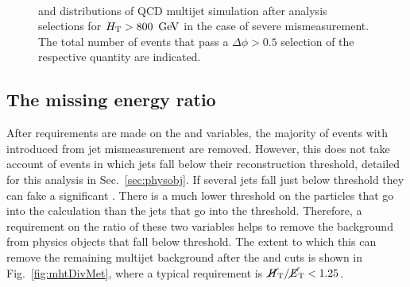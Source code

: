 \begin{figure}[!h]
 \centering
  \\
 \caption{\bdphi and \dphimhtj distributions of QCD multijet simulation
 after analysis selections for $\mbox{$H_\text{T}$}>800~\mathrm{\,Ge\kern -0.1em V}$ in the case of
 severe mismeasurement. The
 total number of events that pass a $\Delta\phi > 0.5$ selection of the
 respective quantity are indicated. }
 \label{fig:bDPhi_mismeasured}
\end{figure}

\subsection{The missing energy ratio \mhtmet}
\label{sec:mhtmet}

After requirements are made on the \alphat and \bdphi variables, the
majority of events with \MHT introduced from jet mismeasurement are
removed. However, this does not take account of events in which jets
fall below their reconstruction threshold, detailed for this analysis
in Sec.~\ref{sec:physobj}. If several jets fall just below threshold
they can fake a significant \MHT. There is a much lower threshold
on the particles that go into the \MET calculation than the jets that
go into the \MHT threshold. Therefore, a requirement on the ratio of
these two variables helps to remove the background from physics
objects
that fall below threshold. The extent to which this can remove the
remaining \QCD multijet background after the \alphat and \bdphi cuts
is shown in Fig.~\ref{fig:mhtDivMet}, where a typical requirement is
$\mbox{$\mbox{$\cancel{H}_\text{T}$} / \mbox{$\cancel{E}_\text{T}$}$}<1.25$.

